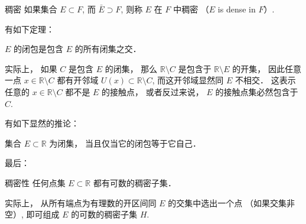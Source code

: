 \begin{definition}{稠密}
如果集合 $E\subset F$, 而 $\bar E\supset F$, 则称 $E$ 在 $F$ 中稠密 （$E$ is dense in $F$）.
\end{definition}

有如下定理：

\begin{theorem}{}
$E$ 的闭包是包含 $E$ 的所有闭集之交．
\end{theorem}
实际上， 如果 $C$ 是包含 $E$ 的闭集， 那么 $\mathbb{R}\setminus C$ 是包含于 $\mathbb{R}\setminus E$ 的开集， 因此任意一点 $x\in\mathbb{R}\setminus C$ 都有开邻域 $U(x)\subset\mathbb{R}\setminus C$, 而这开邻域显然同 $E$ 不相交． 这表示任意的 $x\in\mathbb{R}\setminus C$ 都不是 $E$ 的接触点， 或者反过来说， $E$ 的接触点集必然包含于 $C$. 

有如下显然的推论：
\begin{corollary}{}
集合 $E\subset\mathbb{R}$ 为闭集， 当且仅当它的闭包等于它自己．
\end{corollary}

最后：
\begin{theorem}{稠密性}
任何点集 $E\subset\mathbb{R}$ 都有可数的稠密子集．
\end{theorem}
实际上， 从所有端点为有理数的开区间同 $E$ 的交集中选出一个点 （如果交集非空）, 即可组成 $E$ 的可数的稠密子集 $H$.